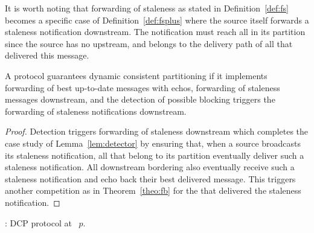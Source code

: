 It is worth noting that forwarding of staleness as stated in
Definition~\ref{def:fs} becomes a specific case of
Definition~\ref{def:fsplus} where the source itself forwards a
staleness notification downstream. The notification must reach all
\processes in its partition since the source has no \processes
upstream, and belongs to the delivery path of all \processes that
delivered this message.

\begin{theorem}
  A protocol guarantees dynamic consistent partitioning if it
  implements forwarding of best up-to-date messages with echos,
  forwarding of staleness messages downstream, and the detection of
  possible blocking triggers the forwarding of staleness notifications
  downstream.
\end{theorem}

\begin{proof}
  Detection triggers forwarding of staleness downstream which
  completes the case study of Lemma~\ref{lem:detector} by ensuring
  that, when a source broadcasts its staleness notification, all
  \processes that belong to its partition eventually deliver such a
  staleness notification. All downstream bordering \processes also
  eventually receive such a staleness notification and echo back their
  best delivered message. This triggers another competition as in
  Theorem~\ref{theo:fb} for the \processes that delivered the
  staleness notification.
\end{proof}

\begin{algorithm}
  
  \caption{\label{algo:ascast}\NAME: DCP protocol at \Process~$p$.}
\end{algorithm}

